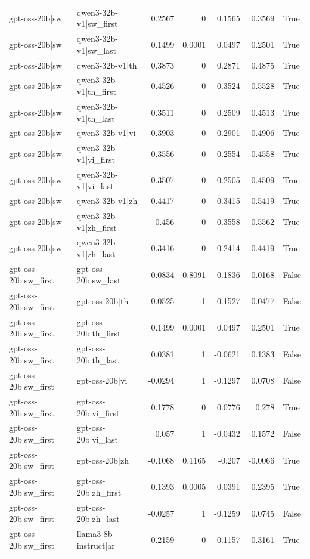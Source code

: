 \begin{table}
\begin{tabular}{l l r r r r l}
gpt-oss-20b|sw & qwen3-32b-v1|sw_first & 0.2567 & 0 & 0.1565 & 0.3569 & True \\
gpt-oss-20b|sw & qwen3-32b-v1|sw_last & 0.1499 & 0.0001 & 0.0497 & 0.2501 & True \\
gpt-oss-20b|sw & qwen3-32b-v1|th & 0.3873 & 0 & 0.2871 & 0.4875 & True \\
gpt-oss-20b|sw & qwen3-32b-v1|th_first & 0.4526 & 0 & 0.3524 & 0.5528 & True \\
gpt-oss-20b|sw & qwen3-32b-v1|th_last & 0.3511 & 0 & 0.2509 & 0.4513 & True \\
gpt-oss-20b|sw & qwen3-32b-v1|vi & 0.3903 & 0 & 0.2901 & 0.4906 & True \\
gpt-oss-20b|sw & qwen3-32b-v1|vi_first & 0.3556 & 0 & 0.2554 & 0.4558 & True \\
gpt-oss-20b|sw & qwen3-32b-v1|vi_last & 0.3507 & 0 & 0.2505 & 0.4509 & True \\
gpt-oss-20b|sw & qwen3-32b-v1|zh & 0.4417 & 0 & 0.3415 & 0.5419 & True \\
gpt-oss-20b|sw & qwen3-32b-v1|zh_first & 0.456 & 0 & 0.3558 & 0.5562 & True \\
gpt-oss-20b|sw & qwen3-32b-v1|zh_last & 0.3416 & 0 & 0.2414 & 0.4419 & True \\
gpt-oss-20b|sw_first & gpt-oss-20b|sw_last & -0.0834 & 0.8091 & -0.1836 & 0.0168 & False \\
gpt-oss-20b|sw_first & gpt-oss-20b|th & -0.0525 & 1 & -0.1527 & 0.0477 & False \\
gpt-oss-20b|sw_first & gpt-oss-20b|th_first & 0.1499 & 0.0001 & 0.0497 & 0.2501 & True \\
gpt-oss-20b|sw_first & gpt-oss-20b|th_last & 0.0381 & 1 & -0.0621 & 0.1383 & False \\
gpt-oss-20b|sw_first & gpt-oss-20b|vi & -0.0294 & 1 & -0.1297 & 0.0708 & False \\
gpt-oss-20b|sw_first & gpt-oss-20b|vi_first & 0.1778 & 0 & 0.0776 & 0.278 & True \\
gpt-oss-20b|sw_first & gpt-oss-20b|vi_last & 0.057 & 1 & -0.0432 & 0.1572 & False \\
gpt-oss-20b|sw_first & gpt-oss-20b|zh & -0.1068 & 0.1165 & -0.207 & -0.0066 & True \\
gpt-oss-20b|sw_first & gpt-oss-20b|zh_first & 0.1393 & 0.0005 & 0.0391 & 0.2395 & True \\
gpt-oss-20b|sw_first & gpt-oss-20b|zh_last & -0.0257 & 1 & -0.1259 & 0.0745 & False \\
gpt-oss-20b|sw_first & llama3-8b-instruct|ar & 0.2159 & 0 & 0.1157 & 0.3161 & True \\

\end{tabular}
\end{table}
